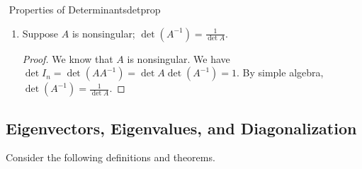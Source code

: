 \begin{theorem}{\Stop\,\,Properties of Determinants}{detprop}
\begin{enumerate}
\begin{proof}
                    \begin{equation*}
                        \det A = \det(R_k(\ldots R_2(R_1(I_n))\ldots))=\det((R_k(\ldots R_2(R_1(I_n))\ldots))^T)=\det (A^T),
                    \end{equation*}
                    proving the proposition.
                \end{proof}
                \item Suppose \(A\) is nonsingular; \(\det (A^{-1}) = \frac{1}{\det A}\).
                \begin{proof}
                    We know that \(A\) is nonsingular. We have \(\det I_n=\det(AA^{-1})=\det A\det (A^{-1})=1\). By simple algebra, \(\det (A^{-1})=\frac{1}{\det A}\).
                \end{proof}
            \end{enumerate}
            
        \end{theorem}

    \pagebreak

    \subsection{Eigenvectors, Eigenvalues, and Diagonalization}

        Consider the following definitions and theorems.

